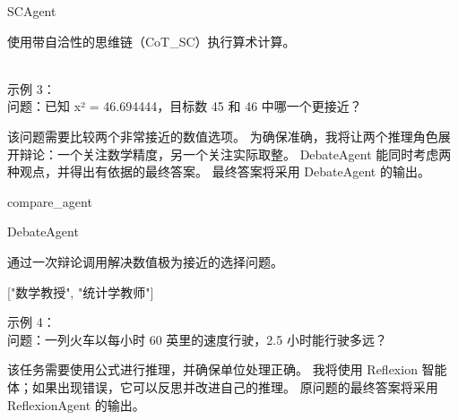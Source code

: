 \begin{userprompt}[title={用户提示词}]
\quad{}SCAgent

\quad{}
使用带自洽性的思维链（CoT\_SC）执行算术计算。

\quad{}

\qquad{}

\quad{}

 \\

示例 3：\\

问题：已知 x² = 46.694444，目标数 45 和 46 中哪一个更接近？\\


该问题需要比较两个非常接近的数值选项。
为确保准确，我将让两个推理角色展开辩论：一个关注数学精度，另一个关注实际取整。
DebateAgent 能同时考虑两种观点，并得出有依据的最终答案。
最终答案将采用 DebateAgent 的输出。



\quad{}compare\_agent

\quad{}DebateAgent

\quad{}
通过一次辩论调用解决数值极为接近的选择问题。

\quad{}

\qquad{}

\qquad{}
["数学教授", "统计学教师"]

\quad{}


示例 4：\\

问题：一列火车以每小时 60 英里的速度行驶，2.5 小时能行驶多远？\\


该任务需要使用公式进行推理，并确保单位处理正确。
我将使用 Reflexion 智能体；如果出现错误，它可以反思并改进自己的推理。
原问题的最终答案将采用 ReflexionAgent 的输出。




\end{userprompt}
